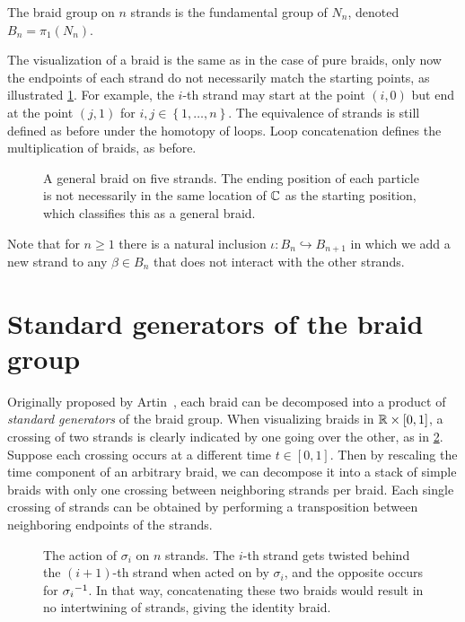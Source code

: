 \begin{definition}
    The braid group on $n$ strands is the fundamental group of $N_n$, denoted $B_n = \pi_1(N_n)$.
\end{definition}

The visualization of a braid is the same as in the case of pure braids, only now the endpoints of each strand do not necessarily match the starting points, as illustrated \cref{fig:C_general_braid}. For example, the $i$-th strand may start at the point $(i,0)$ but end at the point $(j,1)$ for $i,j\in\left\{ 1,\dots,n \right\}$. The equivalence of strands is still defined as before under the homotopy of loops. Loop concatenation defines the multiplication of braids, as before.

\begin{figure}[htbp]
    \centering
    
    \caption{A general braid on five strands. The ending position of each particle is not necessarily in the same location of $\mathbb{C}$ as the starting position, which classifies this as a general braid.}\label{fig:C_general_braid}
\end{figure}

Note that for $n\geq 1$ there is a natural inclusion $\iota:B_n\hookrightarrow B_{n+1}$ in which we add a new strand to any $\beta\in B_n$ that does not interact with the other strands.

\section{Standard generators of the braid group}\label{sec:std_gens}
Originally proposed by Artin~\cite{Artin1947}, each braid can be decomposed into a product of \textit{standard generators} of the braid group. When visualizing braids in $\mathbb{R}\times[0,1]$, a crossing of two strands is clearly indicated by one going over the other, as in \cref{fig:Gen_on_Strands}. Suppose each crossing occurs at a different time $t\in[0,1]$. Then by rescaling the time component of an arbitrary braid, we can decompose it into a stack of simple braids with only one crossing between neighboring strands per braid. Each single crossing of strands can be obtained by performing a transposition between neighboring endpoints of the strands.

\begin{figure}[htbp]
    \centering
    
    \caption{The action of $\sigma_i$ on $n$ strands. The $i$-th strand gets twisted behind the $(i+1)$-th strand when acted on by $\sigma_i$, and the opposite occurs for ${ \sigma_i }^{-1}$. In that way, concatenating these two braids would result in no intertwining of strands, giving the identity braid.}\label{fig:Gen_on_Strands}
\end{figure}

